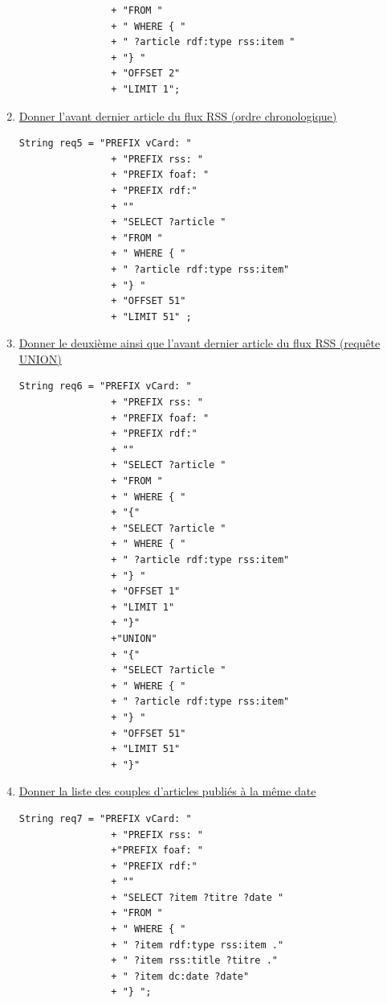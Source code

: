 \documentclass[12pt,a4paper]{article}
\begin{document}
\begin{justify}
\begin{enumerate}
\begin{verbatim}
                + "FROM "
                + " WHERE { "
                + " ?article rdf:type rss:item "
                + "} "
                + "OFFSET 2"
                + "LIMIT 1";
            \end{verbatim}
            \item \underline{Donner l’avant dernier article du flux RSS (ordre chronologique)}
            \begin{verbatim}
String req5 = "PREFIX vCard: "
                + "PREFIX rss: "
                + "PREFIX foaf: "
                + "PREFIX rdf:"
                + ""
                + "SELECT ?article "
                + "FROM "
                + " WHERE { "
                + " ?article rdf:type rss:item"
                + "} "
                + "OFFSET 51"
                + "LIMIT 51" ;
            \end{verbatim}
            \item \underline{Donner le deuxième ainsi que l’avant dernier article du flux RSS (requête UNION)}
            \begin{verbatim}
String req6 = "PREFIX vCard: "
                + "PREFIX rss: "
                + "PREFIX foaf: "
                + "PREFIX rdf:"
                + ""
                + "SELECT ?article "
                + "FROM "
                + " WHERE { "
                + "{"
                + "SELECT ?article "
                + " WHERE { "
                + " ?article rdf:type rss:item"
                + "} "
                + "OFFSET 1"
                + "LIMIT 1"
                + "}"
                +"UNION"
                + "{"
                + "SELECT ?article "
                + " WHERE { "
                + " ?article rdf:type rss:item"
                + "} "
                + "OFFSET 51"
                + "LIMIT 51"
                + "}"
            \end{verbatim}
            \item \underline{Donner la liste des couples d’articles publiés à la même date}
            \begin{verbatim}
String req7 = "PREFIX vCard: "
                + "PREFIX rss: "
                +"PREFIX foaf: "
                + "PREFIX rdf:"
                + ""
                + "SELECT ?item ?titre ?date "
                + "FROM "
                + " WHERE { "
                + " ?item rdf:type rss:item ."
                + " ?item rss:title ?titre ."
                + " ?item dc:date ?date"
                + "} ";
            \end{verbatim}

\end{enumerate}
\end{justify}
\end{document}
